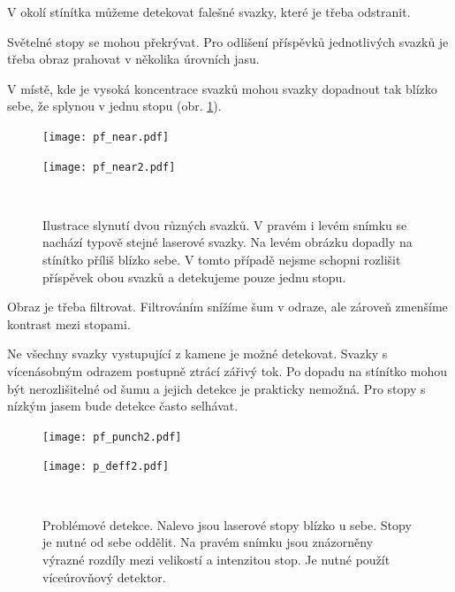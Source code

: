 V okolí stínítka můžeme detekovat falešné svazky, které je třeba odstranit. 

Světelné stopy se mohou překrývat. Pro odlišení příspěvků jednotlivých svazků je třeba obraz prahovat v několika úrovních jasu.

V místě, kde je vysoká koncentrace svazků mohou svazky dopadnout tak blízko sebe, že splynou v jednu stopu (obr. \ref{Splynuti}).  

\begin{figure}[h!]
    \centering
    \begin{minipage}[c]{0.48\textwidth}
        \centering\texttt{[image: pf\_near.pdf]}
    \end{minipage}
    \begin{minipage}[c]{0.48\textwidth}
        \centering\texttt{[image: pf\_near2.pdf]}
    \end{minipage}
    \\
        \caption[Splynutí dvou různých svazků.]{Ilustrace slynutí dvou různých svazků. V pravém i levém snímku se nachází typově stejné laserové svazky. Na levém obrázku dopadly na stínítko příliš blízko sebe. V tomto případě nejsme schopni rozlišit příspěvek obou svazků a detekujeme pouze jednu stopu.}
        \label{Splynuti}
\end{figure}

Obraz je třeba filtrovat. Filtrováním snížíme šum v odraze, ale zároveň zmenšíme kontrast mezi stopami. 

Ne všechny svazky vystupující z kamene je možné detekovat. Svazky s vícenásobným odrazem postupně ztrácí zářivý tok. Po dopadu na stínítko mohou být nerozlišitelné od šumu a jejich detekce je prakticky nemožná. Pro stopy s nízkým jasem bude detekce často selhávat.

\begin{figure}[h!]
    \centering
    \begin{minipage}[c]{0.48\textwidth}
        \centering\texttt{[image: pf\_punch2.pdf]}
    \end{minipage}
    \begin{minipage}[c]{0.48\textwidth}
        \centering\texttt{[image: p\_deff2.pdf]}
    \end{minipage}
    \\
        \caption[Problémové detekce.]{Problémové detekce. Nalevo jsou laserové stopy blízko u sebe. Stopy je nutné od sebe oddělit. Na pravém snímku jsou znázorněny výrazné rozdíly mezi velikostí a intenzitou stop. Je nutné použít víceúrovňový detektor. }
        \label{fig:Detekce}
\end{figure}

